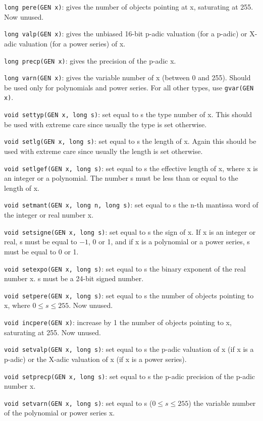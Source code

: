 {\tt long pere(GEN x)}: gives the number of objects pointing at x, saturating
at 255. Now unused.

{\tt long valp(GEN x)}: gives the unbiased 16-bit p-adic valuation (for a
p-adic) or X-adic valuation (for a power series) of x.

{\tt long precp(GEN x)}: gives the precision of the p-adic x.

{\tt long varn(GEN x)}: gives the variable number of x (between 0 and 255).
Should be used only for polynomials and power series. For all other types,
use {\tt gvar(GEN x)}.

{\tt void settyp(GEN x, long s)}: set equal to s the type number of x. This
should be used with extreme care since usually the type is set otherwise.

{\tt void setlg(GEN x, long s)}: set equal to s the length of x. Again this
should be used with extreme care since usually the length is set otherwise.

{\tt void setlgef(GEN x, long s)}: set equal to s the effective length of x,
where x is an integer or a polynomial. The number s must be less than or equal
to the length of x.

{\tt void setmant(GEN x, long n, long s)}: set equal to s the n-th mantissa
word of the integer or real number x.

{\tt void setsigne(GEN x, long s)}: set equal to s the sign of x. If x is an
integer or real, s must be equal to $-1$, 0 or 1, and if x is a polynomial or
a power series, s must be equal to 0 or 1.

{\tt void setexpo(GEN x, long s)}: set equal to s the binary exponent of
the real number x. s must be a 24-bit signed number.

{\tt void setpere(GEN x, long s)}: set equal to s the number of objects 
pointing to x, where $0\le s\le255$. Now unused.

{\tt void incpere(GEN x)}: increase by 1 the number of objects pointing to x,
saturating at 255. Now unused.

{\tt void setvalp(GEN x, long s)}: set equal to s the p-adic valuation of x
(if x is a p-adic) or the X-adic valuation of x (if x is a power series).

{\tt void setprecp(GEN x, long s)}: set equal to s the p-adic precision of the
p-adic number x.

{\tt void setvarn(GEN x, long s)}: set equal to s ($0\le s\le255$) the variable
number of the polynomial or power series x.


